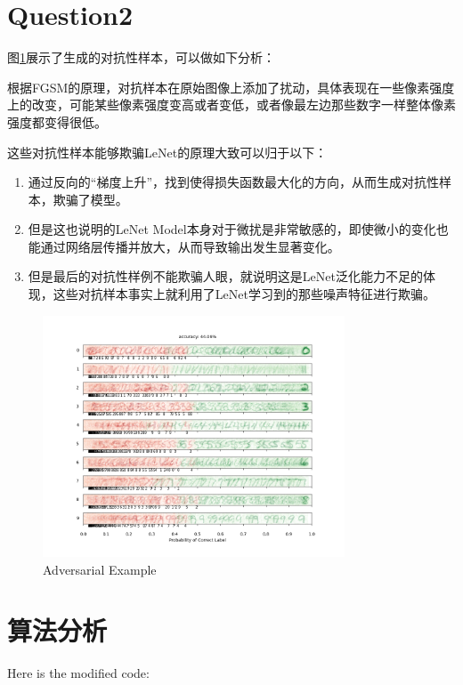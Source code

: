 \documentclass[UTF8]{ctexart}
\begin{document}
\section{Question2}

图\ref{fig:Adversarial}展示了生成的对抗性样本，可以做如下分析：

根据FGSM的原理，对抗样本在原始图像上添加了扰动，具体表现在一些像素强度上的改变，可能某些像素强度变高或者变低，或者像最左边那些数字一样整体像素强度都变得很低。

这些对抗性样本能够欺骗LeNet的原理大致可以归于以下：

\begin{enumerate}
    \item 通过反向的“梯度上升”，找到使得损失函数最大化的方向，从而生成对抗性样本，欺骗了模型。
    \item 但是这也说明的LeNet Model本身对于微扰是非常敏感的，即使微小的变化也能通过网络层传播并放大，从而导致输出发生显著变化。
    \item 但是最后的对抗性样例不能欺骗人眼，就说明这是LeNet泛化能力不足的体现，这些对抗样本事实上就利用了LeNet学习到的那些噪声特征进行欺骗。
\end{enumerate}
\begin{figure}[h]
    \centering
    \includegraphics[width=0.8\textwidth]{./image/Adversarial.png}
    \caption{Adversarial Example}
    \label{fig:Adversarial}
\end{figure}

\section{算法分析}

Here is the modified code:
\end{document}
